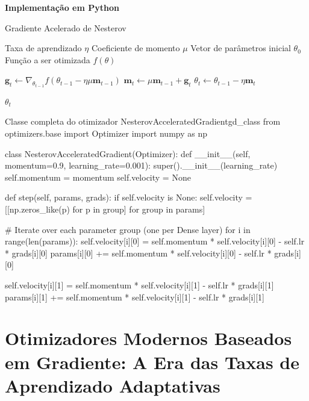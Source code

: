 \textbf{Implementação em Python}

\begin{algorithm}[H] %
    \caption{Gradiente Acelerado de Nesterov}
    \label{alg:gradiente-acelerado-de-nesterov}
    \begin{algorithmic}[1] %

    \Require Taxa de aprendizado $\eta$
    \Require Coeficiente de momento $\mu$
    \Require Vetor de parâmetros inicial $\theta_0$
    \Require Função a ser otimizada $f(\theta)$

        \State $\textbf{g}_t \leftarrow \nabla_{\theta_{t-1}} f(\theta_{t -1} - \eta \mu \textbf{m}_{t-1})$
        \State $\textbf{m}_t \leftarrow \mu \textbf{m}_{t-1} + \textbf{g}_t$
        \State $\theta_t \leftarrow \theta_{t-1} - \eta \textbf{m}_t$
    \EndWhile

    \State \Return $\theta_t$ 
    \end{algorithmic}
\end{algorithm}

\begin{codelisting}{Classe completa do otimizador NesterovAcceleratedGradient}{gd_class}
from optimizers.base import Optimizer
import numpy as np

class NesterovAcceleratedGradient(Optimizer):
    def __init__(self, momentum=0.9, learning_rate=0.001):
        super().__init__(learning_rate)
        self.momentum = momentum
        self.velocity = None

    def step(self, params, grads):
        if self.velocity is None:
            self.velocity = [[np.zeros_like(p) for p in group] for group in params]

        # Iterate over each parameter group (one per Dense layer)
        for i in range(len(params)):
            self.velocity[i][0] = self.momentum * self.velocity[i][0] - self.lr * grads[i][0]
            params[i][0] += self.momentum * self.velocity[i][0] - self.lr * grads[i][0]

            self.velocity[i][1] = self.momentum * self.velocity[i][1] - self.lr * grads[i][1]
            params[i][1] += self.momentum * self.velocity[i][1] - self.lr * grads[i][1]
\end{codelisting}

\section{Otimizadores Modernos Baseados em Gradiente: A Era das Taxas de Aprendizado Adaptativas}

